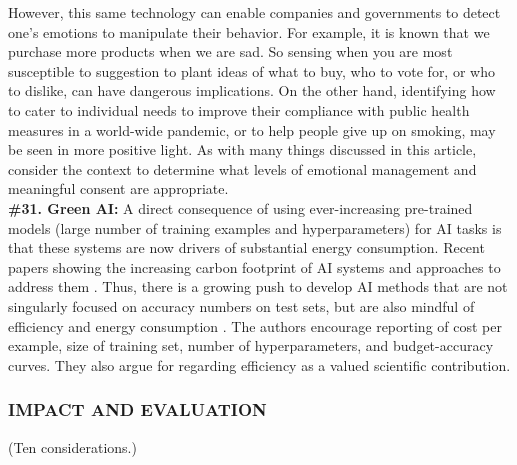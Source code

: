 \documentclass{clv3}
\begin{document}
However, this same technology can enable companies and governments to detect one’s emotions to manipulate their behavior. For example, it is known that we purchase more products when we are sad. So sensing when you are most susceptible to suggestion to plant ideas of what to buy, who to vote for, or who to dislike, can have dangerous implications. On the other hand, identifying how to cater to individual needs to improve their compliance with public health measures in a world-wide pandemic, or to help people give up on smoking, may be seen in more positive light. As with many things discussed in this article, consider the context to determine what levels of emotional management and meaningful consent are appropriate.\\[-1pt]

\noindent \textbf{\#31. Green AI:} A direct consequence of using ever-increasing pre-trained models (large number of training examples and hyperparameters) for AI tasks is that these systems are now drivers of substantial energy consumption. 
Recent papers showing the increasing carbon footprint of AI systems and approaches to address them \cite{Strubell_Ganesh_McCallum_2020,schwartz2020green}.
Thus, there is a growing push to develop AI methods that are not singularly focused on accuracy numbers on test sets, but are also mindful of efficiency and energy consumption \cite{schwartz2020green}. The authors encourage reporting of cost per example, size of training set, number of hyperparameters, and budget-accuracy curves. They also argue for regarding efficiency as a valued scientific contribution.

\subsubsection{IMPACT AND EVALUATION} (Ten considerations.)\\
\label{sec:impact}

\end{document}
